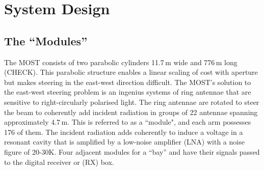 \section{System Design}

\subsection{The ``Modules''}
The MOST consists of two parabolic cylinders 11.7\,m wide and 776\,m long (CHECK). This parabolic structure enables a linear scaling of cost with aperture but makes steering in the east-west direction difficult. The MOST's solution to the east-west steering problem is an ingenius systems of ring antennae that are sensitive to right-circularly polarised light. The ring antennae are rotated to steer the beam to coherently add incident radiation in groups of 22 antennae spanning approximately 4.7\,m. This is referred to as a ``module", and each arm possesses 176 of them.
The incident radiation adds coherently to induce a voltage in a resonant cavity that is amplified by a low-noise amplifier (LNA) with a noise figure of 20-30K. Four adjacent modules for a ``bay'' and have their signals passed to the digital receiver or (RX) box.
